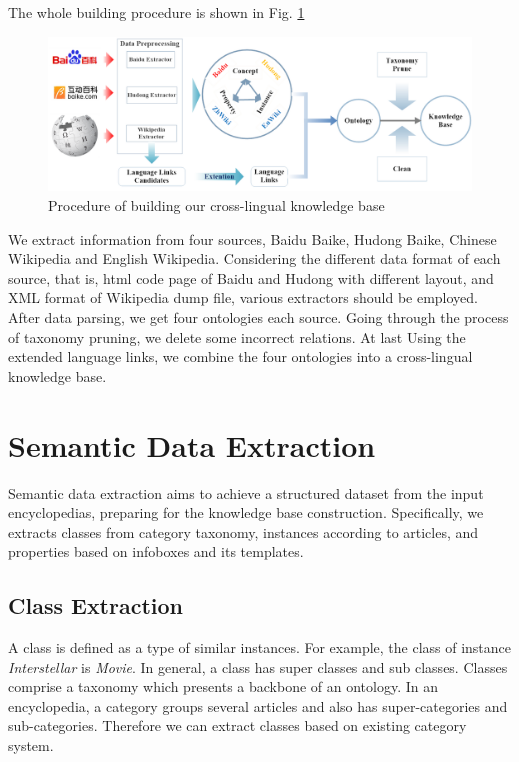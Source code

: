 \documentclass[runningheads,a4paper]{llncs}
\begin{document}
The whole building procedure is shown in Fig. \ref{fig:procedure}
\begin{figure}[ht]
    \centerline{\includegraphics[width=1\columnwidth]{fig/procedure}}
    \caption{Procedure of building our cross-lingual knowledge base}
    \label{fig:procedure}
\end{figure}%
We extract information from four sources, Baidu Baike, Hudong Baike, Chinese Wikipedia and English Wikipedia. Considering the different data format of each source, that is, html code page of Baidu and Hudong with different layout, and XML format of Wikipedia dump file, various extractors should be employed. After data parsing, we get four ontologies each source. Going through the process of taxonomy pruning, we delete some incorrect relations. At last Using the extended language links, we combine the four ontologies into a cross-lingual knowledge base.

\section{Semantic Data Extraction}
\label{sec:dp}
Semantic data extraction aims to achieve a structured dataset from the input encyclopedias, preparing for the knowledge base construction. Specifically, we extracts classes from category taxonomy, instances according to articles, and properties based on infoboxes and its templates.

\subsection{Class Extraction}
\label{sec:ce}
A class is defined as a type of similar instances. For example, the class of instance \emph{Interstellar} is \emph{Movie}. In general, a class has super classes and sub classes. Classes comprise a taxonomy which presents a backbone of an ontology. In an encyclopedia, a category groups several articles and also has super-categories and sub-categories. Therefore we can extract classes based on existing category system.
\end{document}
